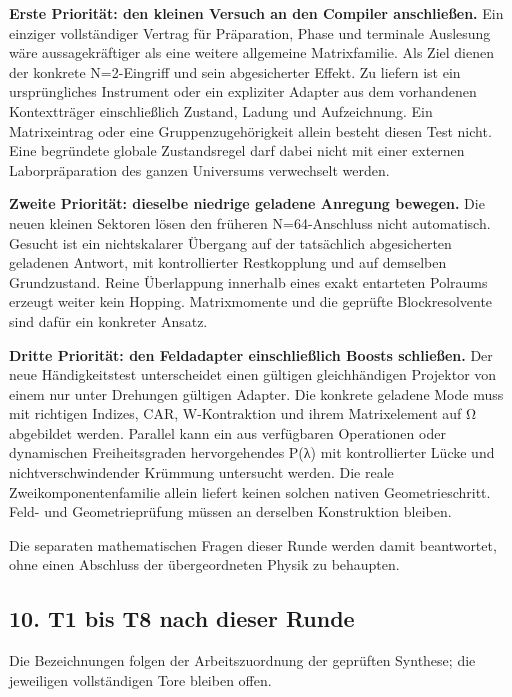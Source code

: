 \textbf{Erste Priorität: den kleinen Versuch an den Compiler
anschließen.} Ein einziger vollständiger Vertrag für Präparation, Phase
und terminale Auslesung wäre aussagekräftiger als eine weitere
allgemeine Matrixfamilie. Als Ziel dienen der konkrete N=2-Eingriff und
sein abgesicherter Effekt. Zu liefern ist ein ursprüngliches Instrument
oder ein expliziter Adapter aus dem vorhandenen Kontextträger
einschließlich Zustand, Ladung und Aufzeichnung. Ein Matrixeintrag oder
eine Gruppenzugehörigkeit allein besteht diesen Test nicht. Eine
begründete globale Zustandsregel darf dabei nicht mit einer externen
Laborpräparation des ganzen Universums verwechselt werden.

\textbf{Zweite Priorität: dieselbe niedrige geladene Anregung bewegen.}
Die neuen kleinen Sektoren lösen den früheren N=64-Anschluss nicht
automatisch. Gesucht ist ein nichtskalarer Übergang auf der tatsächlich
abgesicherten geladenen Antwort, mit kontrollierter Restkopplung und auf
demselben Grundzustand. Reine Überlappung innerhalb eines exakt
entarteten Polraums erzeugt weiter kein Hopping. Matrixmomente und die
geprüfte Blockresolvente sind dafür ein konkreter Ansatz.

\textbf{Dritte Priorität: den Feldadapter einschließlich Boosts
schließen.} Der neue Händigkeitstest unterscheidet einen gültigen
gleichhändigen Projektor von einem nur unter Drehungen gültigen Adapter.
Die konkrete geladene Mode muss mit richtigen Indizes, CAR,
W-Kontraktion und ihrem Matrixelement auf Ω abgebildet werden. Parallel
kann ein aus verfügbaren Operationen oder dynamischen Freiheitsgraden
hervorgehendes P(λ) mit kontrollierter Lücke und nichtverschwindender
Krümmung untersucht werden. Die reale Zweikomponentenfamilie allein
liefert keinen solchen nativen Geometrieschritt. Feld- und
Geometrieprüfung müssen an derselben Konstruktion bleiben.

Die separaten mathematischen Fragen dieser Runde werden damit
beantwortet, ohne einen Abschluss der übergeordneten Physik zu
behaupten.

\subsection{10. T1 bis T8 nach dieser
Runde}\label{t1-bis-t8-nach-dieser-runde}

Die Bezeichnungen folgen der Arbeitszuordnung der geprüften Synthese;
die jeweiligen vollständigen Tore bleiben offen.

